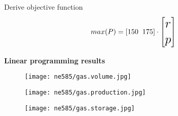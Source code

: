 \documentclass[aspectratio=1610,pdftex,dvipsnames,compress,xcolor={dvipsnames}]{beamer}
\begin{document}
\begin{frame}{Derive objective function}
    \begin{equation}
        \LARGE
        max(P) = [150 \; \; 175]
            \cdot 
        \begin{bmatrix} r \\ p \end{bmatrix}
    \end{equation}
\end{frame}


\begin{frame}[plain]{}
    \centering\Large\textbf{Linear programming results}
\end{frame}


\addtocounter{framenumber}{-1} 
\begin{frame}{}
    \begin{figure}
        \centering
        \texttt{[image: ne585/gas.volume.jpg]}
    \end{figure}
\end{frame}


\begin{frame}{}
    \begin{figure}
        \centering
        \texttt{[image: ne585/gas.production.jpg]}
    \end{figure}
\end{frame}


\begin{frame}{}
    \begin{figure}
        \centering
        \texttt{[image: ne585/gas.storage.jpg]}
    \end{figure}
\end{frame}
\end{document}
